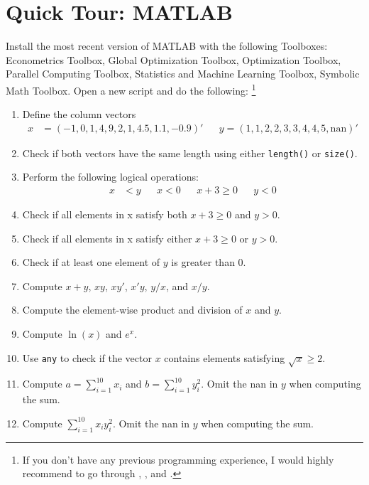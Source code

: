 \section[Quick Tour: MATLAB]{Quick Tour: MATLAB\label{ex:QuickTourMATLAB}}
Install the most recent version of MATLAB with the following Toolboxes:
	Econometrics Toolbox,
	Global Optimization Toolbox,
	Optimization Toolbox,
	Parallel Computing Toolbox,
	Statistics and Machine Learning Toolbox,
	Symbolic Math Toolbox. Open a new script and do the following:
\footnote{If you don't have any previous programming experience,
  I would highly recommend to go through
  \textcite[Appendix A]{Brandimarte_2006_NumericalMethodsFinance},
  \textcite[Appendix B]{Miranda.Fackler_2002_AppliedComputationalEconomics},
  and \textcite{Pfeifer_2017_MATLABHandout}.}

\begin{enumerate}
	\item Define the column vectors
	\begin{align*}
		x &=\left( -1,0,1,4,9,2,1,4.5,1.1,-0.9\right)' && y =\left( 1,1,2,2,3,3,4,4,5,\text{nan}\right)'
	\end{align*}
	\item Check if both vectors have the same length using either \texttt{length()} or \texttt{size()}. 
	\item Perform the following logical operations:
	\begin{align*}
		x &<y &&
		x <0 &&
		x+3 \geq 0 &&
		y <0
	\end{align*}
	\item Check if all elements in x satisfy both $x+3\geq 0$ and $y>0$.
	\item Check if all elements in x satisfy either $x+3\geq 0$ or $y>0$.
	\item Check if at least one element of $y$ is greater than $0$.
	\item Compute $x+y$, $xy$, $xy'$, $x'y$, $y/x$, and $x/y$.
	\item Compute the element-wise product and division of $x$ and $y$.
	\item Compute $\ln (x)$ and $e^x$.
	\item Use \texttt{any} to check if the vector $x$ contains elements	satisfying $\sqrt{x}\geq 2$.
	\item Compute
	$a =\sum_{i=1}^{10}x_{i}$ and $b =\sum_{i=1}^{10}y_{i}^{2}$.
	Omit the nan in $y$ when computing the sum.
	\item Compute $\sum_{i=1}^{10}x_{i}y_{i}^{2}$.
	Omit the nan in $y$ when computing the sum.

\end{enumerate}
